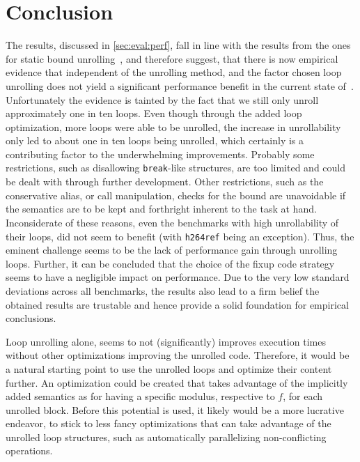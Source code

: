\chapter{Conclusion}\label{sec:conclusion}

The results, discussed in \cref{sec:eval:perf}, fall in line with the results from the ones for static bound unrolling~\cite{aebi18bachelorarbeit}, and therefore suggest, that there is now empirical evidence that independent of the unrolling method, and the factor chosen loop unrolling does not yield a significant performance benefit in the current state of~\libFIRM.
Unfortunately the evidence is tainted by the fact that we still only unroll approximately one in ten loops.
Even though through the added loop optimization, more loops were able to be unrolled, the increase in unrollability only led to about one in ten loops being unrolled, which certainly is a contributing factor to the underwhelming improvements.
Probably some restrictions, such as disallowing \texttt{break}-like structures, are too limited and could be dealt with through further development.
Other restrictions, such as the conservative alias, or call manipulation, checks for the bound are unavoidable if the semantics are to be kept and forthright inherent to the task at hand.
Inconsiderate of these reasons, even the benchmarks with high unrollability of their loops, did not seem to benefit (with \texttt{h264ref} being an exception).
Thus, the eminent challenge seems to be the lack of performance gain through unrolling loops.
Further, it can be concluded that the choice of the fixup code strategy seems to have a negligible impact on performance.
Due to the very low standard deviations across all benchmarks, the results also lead to a firm belief the obtained results are trustable and hence provide a solid foundation for empirical conclusions.

Loop unrolling alone, seems to not (significantly) improves execution times without other optimizations improving the unrolled code.
Therefore, it would be a natural starting point to use the unrolled loops and optimize their content further.
An optimization could be created that takes advantage of the implicitly added semantics as for having a specific modulus, respective to $f$, for each unrolled block.
Before this potential is used, it likely would be a more lucrative endeavor, to stick to less fancy optimizations that can take advantage of the unrolled loop structures, such as automatically parallelizing non-conflicting operations.

